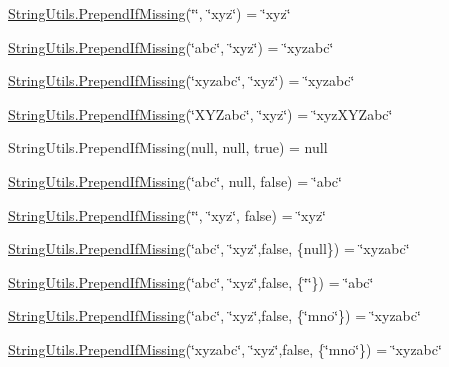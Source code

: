 \hyperlink{class_ultimate_1_1_utilities_1_1_string_utils_a0431fe5c4ada5c40fc0be3a64c6c3640}{String\+Utils.\+Prepend\+If\+Missing}(\char`\"{}\char`\"{}, \char`\"{}xyz\char`\"{}) = \char`\"{}xyz\char`\"{} 

\hyperlink{class_ultimate_1_1_utilities_1_1_string_utils_a0431fe5c4ada5c40fc0be3a64c6c3640}{String\+Utils.\+Prepend\+If\+Missing}(\char`\"{}abc\char`\"{}, \char`\"{}xyz\char`\"{}) = \char`\"{}xyzabc\char`\"{} 

\hyperlink{class_ultimate_1_1_utilities_1_1_string_utils_a0431fe5c4ada5c40fc0be3a64c6c3640}{String\+Utils.\+Prepend\+If\+Missing}(\char`\"{}xyzabc\char`\"{}, \char`\"{}xyz\char`\"{}) = \char`\"{}xyzabc\char`\"{} 

\hyperlink{class_ultimate_1_1_utilities_1_1_string_utils_a0431fe5c4ada5c40fc0be3a64c6c3640}{String\+Utils.\+Prepend\+If\+Missing}(\char`\"{}\+X\+Y\+Zabc\char`\"{}, \char`\"{}xyz\char`\"{}) = \char`\"{}xyz\+X\+Y\+Zabc\char`\"{} 

String\+Utils.\+Prepend\+If\+Missing(null, null, true) = null 

\hyperlink{class_ultimate_1_1_utilities_1_1_string_utils_a0431fe5c4ada5c40fc0be3a64c6c3640}{String\+Utils.\+Prepend\+If\+Missing}(\char`\"{}abc\char`\"{}, null, false) = \char`\"{}abc\char`\"{} 

\hyperlink{class_ultimate_1_1_utilities_1_1_string_utils_a0431fe5c4ada5c40fc0be3a64c6c3640}{String\+Utils.\+Prepend\+If\+Missing}(\char`\"{}\char`\"{}, \char`\"{}xyz\char`\"{}, false) = \char`\"{}xyz\char`\"{} 

\hyperlink{class_ultimate_1_1_utilities_1_1_string_utils_a0431fe5c4ada5c40fc0be3a64c6c3640}{String\+Utils.\+Prepend\+If\+Missing}(\char`\"{}abc\char`\"{}, \char`\"{}xyz\char`\"{},false, \{null\}) = \char`\"{}xyzabc\char`\"{} 

\hyperlink{class_ultimate_1_1_utilities_1_1_string_utils_a0431fe5c4ada5c40fc0be3a64c6c3640}{String\+Utils.\+Prepend\+If\+Missing}(\char`\"{}abc\char`\"{}, \char`\"{}xyz\char`\"{},false, \{\char`\"{}\char`\"{}\}) = \char`\"{}abc\char`\"{} 

\hyperlink{class_ultimate_1_1_utilities_1_1_string_utils_a0431fe5c4ada5c40fc0be3a64c6c3640}{String\+Utils.\+Prepend\+If\+Missing}(\char`\"{}abc\char`\"{}, \char`\"{}xyz\char`\"{},false, \{\char`\"{}mno\char`\"{}\}) = \char`\"{}xyzabc\char`\"{} 

\hyperlink{class_ultimate_1_1_utilities_1_1_string_utils_a0431fe5c4ada5c40fc0be3a64c6c3640}{String\+Utils.\+Prepend\+If\+Missing}(\char`\"{}xyzabc\char`\"{}, \char`\"{}xyz\char`\"{},false, \{\char`\"{}mno\char`\"{}\}) = \char`\"{}xyzabc\char`\"{} 

